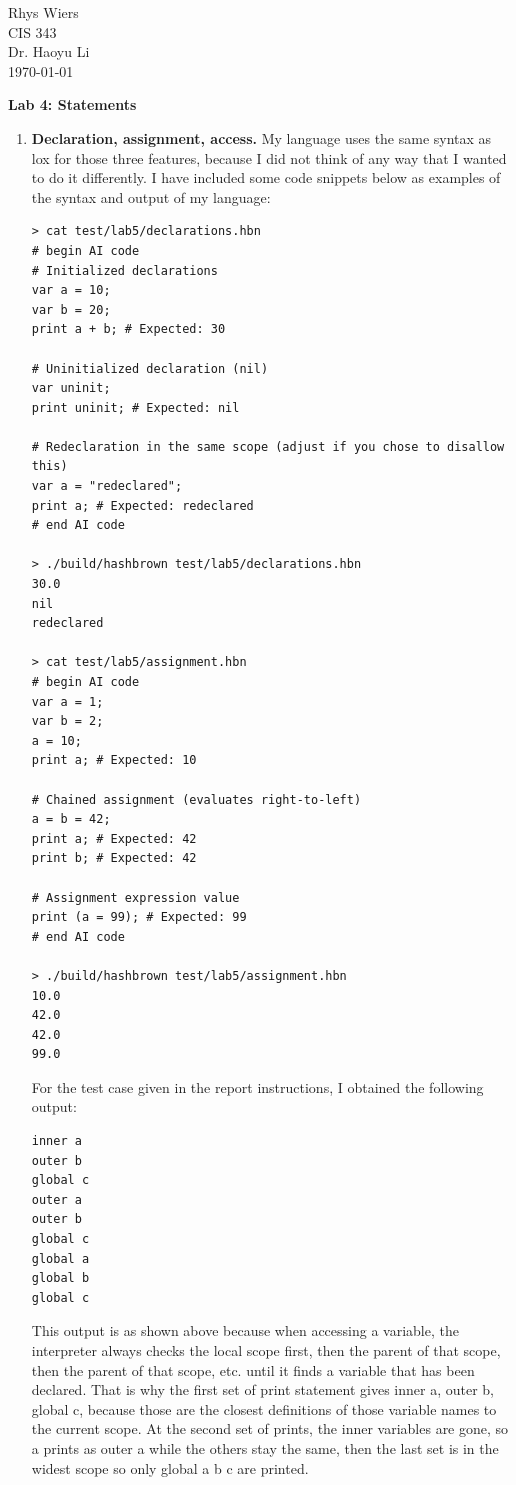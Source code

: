 \documentclass[12pt]{article}
\theoremstyle{definition}
\begin{document}
    \noindent
    Rhys Wiers\\
    CIS 343\\
    Dr. Haoyu Li\\
    \today

    \begin{center}
        {\Large \textbf{Lab 4: Statements}}
    \end{center}

    \begin{enumerate}
        \item \textbf{Declaration, assignment, access.}
            My language uses the same syntax as lox for those three features, because I did not think of any way that I wanted to do it differently. I have included some code snippets below as examples of the syntax and output of my language:
            \begin{verbatim}
> cat test/lab5/declarations.hbn
# begin AI code
# Initialized declarations
var a = 10;
var b = 20;
print a + b; # Expected: 30

# Uninitialized declaration (nil)
var uninit;
print uninit; # Expected: nil

# Redeclaration in the same scope (adjust if you chose to disallow this)
var a = "redeclared";
print a; # Expected: redeclared
# end AI code

> ./build/hashbrown test/lab5/declarations.hbn
30.0
nil
redeclared

> cat test/lab5/assignment.hbn
# begin AI code
var a = 1;
var b = 2;
a = 10;
print a; # Expected: 10

# Chained assignment (evaluates right-to-left)
a = b = 42;
print a; # Expected: 42
print b; # Expected: 42

# Assignment expression value
print (a = 99); # Expected: 99
# end AI code

> ./build/hashbrown test/lab5/assignment.hbn
10.0
42.0
42.0
99.0
            \end{verbatim}

            For the test case given in the report instructions, I obtained the following output:
            \begin{verbatim}
inner a
outer b
global c
outer a
outer b
global c
global a
global b
global c
            \end{verbatim}

            This output is as shown above because when accessing a variable, the interpreter always checks the local scope first, then the parent of that scope, then the parent of that scope, etc. until it finds a variable that has been declared. That is why the first set of print statement gives inner a, outer b, global c, because those are the closest definitions of those variable names to the current scope. At the second set of prints, the inner variables are gone, so a prints as outer a while the others stay the same, then the last set is in the widest scope so only global a b c are printed.


\end{enumerate}
\end{document}
